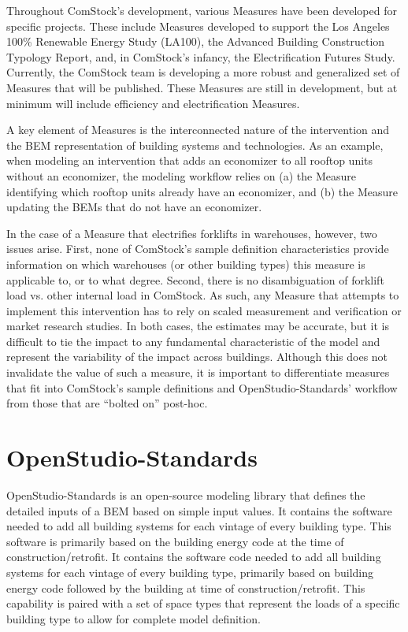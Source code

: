 Throughout ComStock's development, various Measures have been developed for specific projects. These include Measures developed to support the Los Angeles 100\% Renewable Energy Study (LA100), the Advanced Building Construction Typology Report, and, in ComStock's infancy, the Electrification Futures Study. Currently, the ComStock team is developing a more robust and generalized set of Measures that will be published. These Measures are still in development, but at minimum will include efficiency and electrification Measures.

A key element of Measures is the interconnected nature of the intervention and the BEM representation of building systems and technologies. As an example, when modeling an intervention that adds an economizer to all rooftop units without an economizer, the modeling workflow relies on (a) the Measure identifying which rooftop units already have an economizer, and (b) the Measure updating the BEMs that do not have an economizer.

In the case of a Measure that electrifies forklifts in warehouses, however, two issues arise. First, none of ComStock's sample definition characteristics provide information on which warehouses (or other building types) this measure is applicable to, or to what degree. Second, there is no disambiguation of forklift load vs. other internal load in ComStock. As such, any Measure that attempts to implement this intervention has to rely on scaled measurement and verification or market research studies. In both cases, the estimates may be accurate, but it is difficult to tie the impact to any fundamental characteristic of the model and represent the variability of the impact across buildings. Although this does not invalidate the value of such a measure, it is important to differentiate measures that fit into ComStock's sample definitions and OpenStudio-Standards' workflow from those that are ``bolted on'' post-hoc.

\section{OpenStudio-Standards}
\label{sec:openstudio_standards}

OpenStudio-Standards is an open-source modeling library that defines the detailed inputs of a BEM based on simple input values. It contains the software needed to add all building systems for each vintage of every building type. This software is primarily based on the building energy code at the time of construction/retrofit. It contains the software code needed to add all building systems for each vintage of every building type, primarily based on building energy code followed by the building at time of construction/retrofit. This capability is paired with a set of space types that represent the loads of a specific building type to allow for complete model definition.

